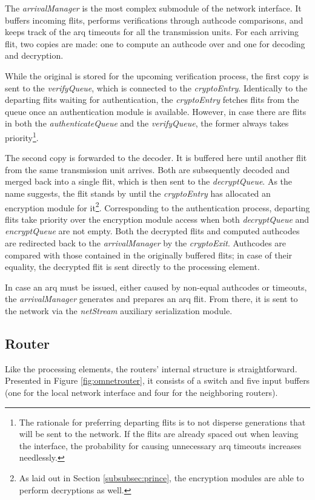 The \textit{arrivalManager} is the most complex submodule of the network interface. It buffers incoming flits, performs verifications through authcode
comparisons, and keeps track of the \gls{arq} timeouts for all the transmission units. For each arriving flit, two copies are made: one to compute an
authcode over and one for decoding and decryption.

While the original is stored for the upcoming verification process, the first copy is sent to the
\textit{verifyQueue}, which is connected to the \textit{cryptoEntry}. Identically to the departing flits waiting for authentication, the
\textit{cryptoEntry} fetches flits from the queue once an authentication module is available. However, in case there are flits in both the
\textit{authenticateQueue} and the \textit{verifyQueue}, the former always takes priority\footnote{The rationale for preferring departing flits is to
not disperse generations that will be sent to the network. If the flits are already spaced out when leaving the interface, the probability for causing
unnecessary \gls{arq} timeouts increases needlessly.}.

The second copy is forwarded to the decoder. It is buffered here until another flit from the
same transmission unit arrives. Both are subsequently decoded and merged back into a single flit, which is then sent to the \textit{decryptQueue}. As
the name suggests, the flit stands by until the \textit{cryptoEntry} has allocated an encryption module for it\footnote{As laid out in Section
\ref{subsubsec:prince}, the encryption modules are able to perform decryptions as well.}. Corresponding to the authentication process, departing flits
take priority over the encryption module access when both \textit{decryptQueue} and \textit{encryptQueue} are not empty. Both the decrypted flits and
computed authcodes are redirected back to the \textit{arrivalManager} by the \textit{cryptoExit}. Authcodes are compared with those contained in the
originally buffered flits; in case of their equality, the decrypted flit is sent directly to the processing element.

In case an \gls{arq} must be issued, either caused by non-equal authcodes or timeouts, the \textit{arrivalManager} generates and prepares an
\gls{arq} flit. From there, it is sent to the network via the \textit{netStream} auxiliary serialization module.

\subsection{Router}
Like the processing elements, the routers' internal structure is straightforward. Presented in Figure \vref{fig:omnetrouter}, it consists of a switch
and five input buffers (one for the local network interface and four for the neighboring routers).

